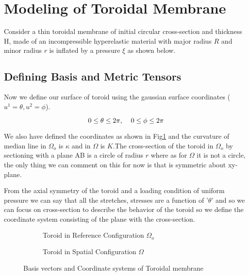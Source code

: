 \documentclass[12pt]{report}
\begin{document}
\section{Modeling of Toroidal Membrane}\label{Model}
Consider a thin toroidal membrane of initial circular cross-section and thickness H,  made of an incompressible hyperelastic material with major radius $R$ and minor radius $r$ is inflated by a pressure $\xi$ as shown below.


\pagebreak

\subsection{Defining Basis and Metric Tensors}

Now we define our surface of toroid using the gaussian surface coordinates ($u^{1}=\theta,u^{2}=\phi$).

\[0\leq\theta\leq2\pi,\hspace{4mm}0\leq\phi\leq2\pi\]

We also have defined the coordinates as shown in Fig\ref{Fig1.7} and the curvature of median line in $\Omega_{o}$ is $\kappa$ and in $\Omega$ is $K$.The cross-section of the toroid in $\Omega_{o}$ by sectioning with a plane AB is a circle of radius $r$ where as for $\Omega$ it is not a circle, the only thing we can comment on this for now is that is symmetric about xy-plane.

From the axial symmetry of the toroid and a loading condition of uniform pressure we can say that all the stretches, stresses are a function of '$\theta$' and so we can focus on cross-section to describe the behavior of the toroid so we define the coordinate system consisting of the plane with the cross-section.

\begin{figure}[ht]
	\centering
	\begin{subfigure}{0.47\textwidth}
		\centering
		\caption{Toroid in Reference Configuration $\Omega_{o}$}
	\end{subfigure}
	\hfill	
	\begin{subfigure}{0.47\textwidth}
		\centering
		\caption{Toroid in Spatial Configuration $\Omega$}
	\end{subfigure}
	\caption{Basis vectors and Coordinate systems of Toroidal membrane}
	\centering
	\label{Fig1.7}
\end{figure}
\end{document}
